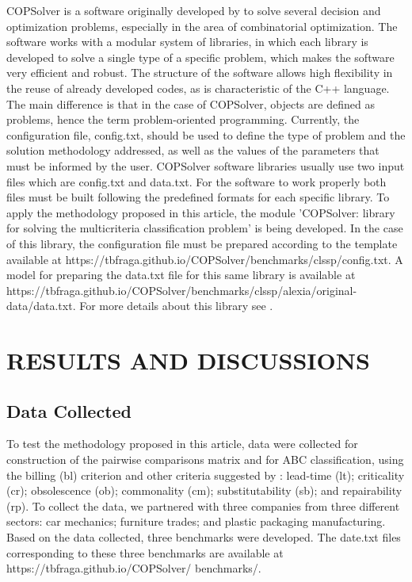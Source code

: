 \documentclass[10pt,fleqn,a4paper,twoside]{article}
\begin{document}
	COPSolver is a software originally developed by \cite{Fraga2023} to solve several decision and optimization problems, especially in the area of combinatorial optimization. The software works with a modular system of libraries, in which each library is developed to solve a single type of a specific problem, which makes the software very efficient and robust. The structure of the software allows high flexibility in the reuse of already developed codes, as is characteristic of the C++ language. The main difference is that in the case of COPSolver, objects are defined as problems, hence the term problem-oriented programming. Currently, the configuration file, config.txt, should be used to define the type of problem and the solution methodology addressed, as well as the values of the parameters that must be informed by the user. COPSolver software libraries usually use two input files which are config.txt and data.txt. For the software to work properly both files must be built following the predefined formats for each specific library. To apply the methodology proposed in this article, the module 'COPSolver: library for solving the multicriteria classification problem' is being developed. In the case of this library, the configuration file must be prepared according to the template available at https://tbfraga.github.io/COPSolver/benchmarks/clssp/config.txt. A model for preparing the data.txt file for this same library is available at https://tbfraga.github.io/COPSolver/benchmarks/clssp/alexia/original-data/data.txt. For more details about this library see \cite{Fraga2024}.
	
	\section{RESULTS AND DISCUSSIONS}
    
    \subsection{Data Collected}
    
    To test the methodology proposed in this article, data were collected for construction of the pairwise comparisons matrix and for ABC classification, using the billing (bl) criterion and other criteria suggested by \cite{FloresWhybark1986}: lead-time (lt); criticality (cr); obsolescence (ob); commonality (cm); substitutability (sb); and repairability (rp). To collect the data, we partnered with three companies from three different sectors: car mechanics; furniture trades; and plastic packaging manufacturing. Based on the data collected, three benchmarks were developed. The date.txt files corresponding to these three benchmarks are available at https://tbfraga.github.io/COPSolver/ benchmarks/.
    
\end{document}
